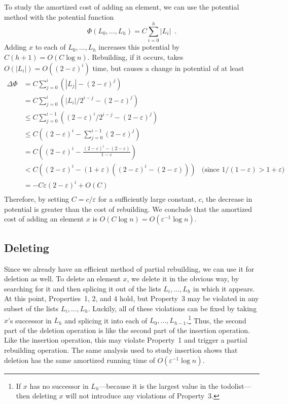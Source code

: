 \documentclass{patmorin}
\newcommand{\eps}{\varepsilon}
\begin{document}
To study the amortized cost of adding an element, we
can use the potential method with the potential function
\[
    \Phi(L_0,\ldots,L_h)=C\sum_{i=0}^h|L_i| \enspace .
\]
Adding $x$ to each of $L_0,\ldots,L_h$ increases this potential by
$C(h+1)=O(C\log n)$.  Rebuilding, if it occurs, takes $O(|L_i|)=O((2-\eps)^i)$
time, but causes a change in potential of at least
\begin{align*}
     \Delta\Phi & = C\sum_{j=0}^i\left(|L_j| - (2-\eps)^j\right) \\
     	& = C\sum_{j=0}^i\left(|L_i|/2^{i-j} - (2-\eps)^j\right) \\ 
          & \le C\sum_{j=0}^{i-1}\left((2-\eps)^i/2^{i-j} - (2-\eps)^j\right) \\
          & \le C\left((2-\eps)^i - \sum_{j=0}^{i-1}(2-\eps)^j\right) \\
          & = C\left((2-\eps)^i - \frac{(2-\eps)^i-(2-\eps)}{1-\eps}\right) \\
          & < C\left((2-\eps)^i - (1+\eps)\left((2-\eps)^i-(2-\eps)\right)\right)
           & \text{(since $1/(1-\eps)>1+\eps$)} \\
          & = -C\eps(2-\eps)^i + O(C) \\
\end{align*}
Therefore, by setting $C=c/\eps$ for a sufficiently large constant,
$c$, the decrease in potential is greater than the cost of rebuilding.
We conclude that the amortized cost of adding an element $x$ is $O(C\log
n)=O(\eps^{-1}\log n)$.

\subsection{Deleting}

Since we already have an efficient method of partial rebuilding, we
can use it for deletion as well. To delete an element $x$, we delete
it in the obvious way, by searching for it and then splicing it out
of the lists $L_i,\ldots,L_h$ in which it appears.  At this point,
Properties~1, 2, and 4 hold, but Property~3 may be violated in any
subset of the lists $L_i,\ldots,L_h$.  Luckily, all of these violations
can be fixed by taking $x$'s successor in $L_h$ and splicing it into
each of $L_0,\ldots,L_{h-1}$.\footnote{If $x$ has no successor in
$L_h$---because it is the largest value in the todolist---then deleting
$x$ will not introduce any violations of Property~3.}  Thus, the second
part of the deletion operation is like the second part of the insertion
operation.  Like the insertion operation, this may violate Property~1
and trigger a partial rebuilding operation.  The same analysis used to
study insertion shows that deletion has the same amortized running time
of $O(\eps^{-1}\log n)$.
\end{document}
